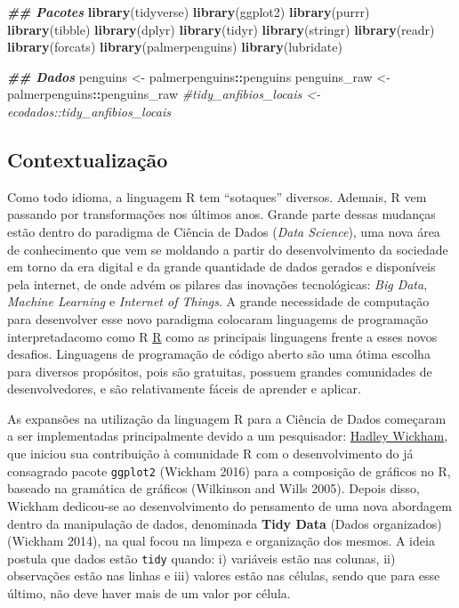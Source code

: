 \documentclass[
]{article}
\newenvironment{Shaded}{\begin{snugshade}}{\end{snugshade}}
\newcommand{\CommentTok}[1]{\textcolor[rgb]{0.56,0.35,0.01}{\textit{#1}}}
\newcommand{\DocumentationTok}[1]{\textcolor[rgb]{0.56,0.35,0.01}{\textbf{\textit{#1}}}}
\newcommand{\FunctionTok}[1]{\textcolor[rgb]{0.13,0.29,0.53}{\textbf{#1}}}
\newcommand{\NormalTok}[1]{#1}
\newcommand{\OtherTok}[1]{\textcolor[rgb]{0.56,0.35,0.01}{#1}}
\newcommand{\SpecialCharTok}[1]{\textcolor[rgb]{0.81,0.36,0.00}{\textbf{#1}}}
\begin{document}
\begin{Shaded}
\begin{Highlighting}[]
\DocumentationTok{\#\# Pacotes}
\FunctionTok{library}\NormalTok{(tidyverse)}
\FunctionTok{library}\NormalTok{(ggplot2)}
\FunctionTok{library}\NormalTok{(purrr)}
\FunctionTok{library}\NormalTok{(tibble)}
\FunctionTok{library}\NormalTok{(dplyr)}
\FunctionTok{library}\NormalTok{(tidyr)}
\FunctionTok{library}\NormalTok{(stringr)}
\FunctionTok{library}\NormalTok{(readr)}
\FunctionTok{library}\NormalTok{(forcats)}
\FunctionTok{library}\NormalTok{(palmerpenguins)}
\FunctionTok{library}\NormalTok{(lubridate)}

\DocumentationTok{\#\# Dados}
\NormalTok{penguins }\OtherTok{\textless{}{-}}\NormalTok{ palmerpenguins}\SpecialCharTok{::}\NormalTok{penguins}
\NormalTok{penguins\_raw }\OtherTok{\textless{}{-}}\NormalTok{ palmerpenguins}\SpecialCharTok{::}\NormalTok{penguins\_raw}
\CommentTok{\#tidy\_anfibios\_locais \textless{}{-} ecodados::tidy\_anfibios\_locais}
\end{Highlighting}
\end{Shaded}

\hypertarget{contextualizauxe7uxe3o-1}{%
\subsection{Contextualização}\label{contextualizauxe7uxe3o-1}}

Como todo idioma, a linguagem R tem ``sotaques'' diversos. Ademais, R vem passando por transformações nos últimos anos. Grande parte dessas mudanças estão dentro do paradigma de Ciência de Dados (\emph{Data Science}), uma nova área de conhecimento que vem se moldando a partir do desenvolvimento da sociedade em torno da era digital e da grande quantidade de dados gerados e disponíveis pela internet, de onde advém os pilares das inovações tecnológicas: \emph{Big Data}, \emph{Machine Learning} e \emph{Internet of Things}. A grande necessidade de computação para desenvolver esse novo paradigma colocaram linguagems de programação interpretadacomo como R \href{https://www.r-project.org/}{R} como as principais linguagens frente a esses novos desafios. Linguagens de programação de código aberto são uma ótima escolha para diversos propósitos, pois são gratuitas, possuem grandes comunidades de desenvolvedores, e são relativamente fáceis de aprender e aplicar.

As expansões na utilização da linguagem R para a Ciência de Dados começaram a ser implementadas principalmente devido a um pesquisador: \href{http://hadley.nz/}{Hadley Wickham}, que iniciou sua contribuição à comunidade R com o desenvolvimento do já consagrado pacote \texttt{ggplot2} (Wickham 2016) para a composição de gráficos no R, baseado na gramática de gráficos (Wilkinson and Wills 2005). Depois disso, Wickham dedicou-se ao desenvolvimento do pensamento de uma nova abordagem dentro da manipulação de dados, denominada \textbf{Tidy Data} (Dados organizados) (Wickham 2014), na qual focou na limpeza e organização dos mesmos. A ideia postula que dados estão \texttt{tidy} quando: i) variáveis estão nas colunas, ii) observações estão nas linhas e iii) valores estão nas células, sendo que para esse último, não deve haver mais de um valor por célula.
\end{document}
